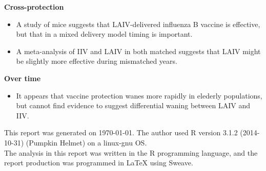 \documentclass[11pt]{article}
\begin{document}
\begin{multicols}{2}
\textbf{Cross-protection}
\begin{itemize}
\item A study of mice suggests that LAIV-delivered influenza B vaccine is effective, but that in a mixed delivery model timing is important. \cite{Huber2008}
\item A meta-analysis of IIV and LAIV in both matched suggests that LAIV might be slightly more effective during mismatched years. \cite{Tricco2013}
\end{itemize}

\textbf{Over time}
\begin{itemize}
\item It appears that vaccine protection wanes more rapidly in elederly populations, but cannot find evidence to suggest differential waning between LAIV and IIV. \cite{cdcrec2014}  
\end{itemize}




\end{multicols}
\newpage



\newpage
This report was generated on \today.  The author used R version 3.1.2 (2014-10-31) (Pumpkin Helmet) on a linux-gnu OS.  \\

The analysis in this report was written in the R programming language, and the report production was programmed in \LaTeX{} using Sweave.\\
\end{document}
